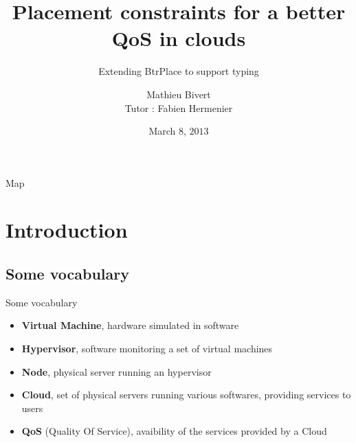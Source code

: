 \documentclass{beamer}
\title{Placement constraints for a better QoS in clouds}
\subtitle{Extending BtrPlace to support typing}
\author[]{Mathieu Bivert\\Tutor : Fabien Hermenier}
\institute{Polytech'Nice Sophia}
\date{March $8$, $2013$}
\begin{document}
\begin{frame}{}
\titlepage
\end{frame}

\begin{frame}{Map}
\tableofcontents
\end{frame}

\section{Introduction}
\subsection{Some vocabulary}
\begin{frame}{Some vocabulary}
\begin{itemize}
	\item{\textbf{Virtual Machine}}, hardware simulated in software
	\item{\textbf{Hypervisor}}, software monitoring a set of virtual
		machines
	\item{\textbf{Node}}, physical server running an hypervisor
	\item{\textbf{Cloud}}, set of physical servers running various
		softwares, providing services to users
	\item{\textbf{QoS}} (Quality Of Service), avaibility of the
		services provided by a Cloud
\end{itemize}
\end{frame}
\end{document}
